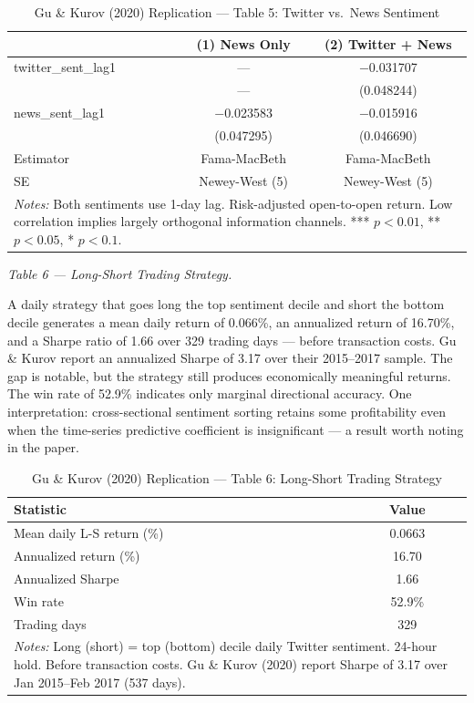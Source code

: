 \documentclass[12pt]{article}
\begin{document}
\begin{table}[htbp]
\centering
\caption{Gu \& Kurov (2020) Replication --- Table 5: Twitter vs.\ News Sentiment}
\label{tab:gk_t5}
\begin{tabular}{lcc}
\hline\hline
 & (1) News Only & (2) Twitter + News \\
\hline
twitter\_sent\_lag1 & --- & $-$0.031707 \\
 & --- & (0.048244) \\
news\_sent\_lag1 & $-$0.023583 & $-$0.015916 \\
 & (0.047295) & (0.046690) \\
\hline
Estimator & Fama-MacBeth & Fama-MacBeth \\
SE & Newey-West (5) & Newey-West (5) \\
\hline\hline
\multicolumn{3}{p{0.9\linewidth}}{\footnotesize \textit{Notes:} Both sentiments use 1-day lag. Risk-adjusted open-to-open return. Low correlation implies largely orthogonal information channels. *** $p<0.01$, ** $p<0.05$, * $p<0.1$.}
\end{tabular}
\end{table}

\medskip

\noindent\textit{Table 6 --- Long-Short Trading Strategy.}

A daily strategy that goes long the top sentiment decile and short the bottom decile generates a mean daily return of 0.066\%, an annualized return of 16.70\%, and a Sharpe ratio of 1.66 over 329 trading days --- before transaction costs. Gu \& Kurov report an annualized Sharpe of 3.17 over their 2015--2017 sample. The gap is notable, but the strategy still produces economically meaningful returns. The win rate of 52.9\% indicates only marginal directional accuracy. One interpretation: cross-sectional sentiment sorting retains some profitability even when the time-series predictive coefficient is insignificant --- a result worth noting in the paper.

\begin{table}[htbp]
\centering
\caption{Gu \& Kurov (2020) Replication --- Table 6: Long-Short Trading Strategy}
\label{tab:gk_t6}
\begin{tabular}{lc}
\hline\hline
Statistic & Value \\
\hline
Mean daily L-S return (\%) & 0.0663 \\
Annualized return (\%) & 16.70 \\
Annualized Sharpe & 1.66 \\
Win rate & 52.9\% \\
Trading days & 329 \\
\hline\hline
\multicolumn{2}{p{0.7\linewidth}}{\footnotesize \textit{Notes:} Long (short) = top (bottom) decile daily Twitter sentiment. 24-hour hold. Before transaction costs. Gu \& Kurov (2020) report Sharpe of 3.17 over Jan 2015--Feb 2017 (537 days).}
\end{tabular}
\end{table}
\end{document}

